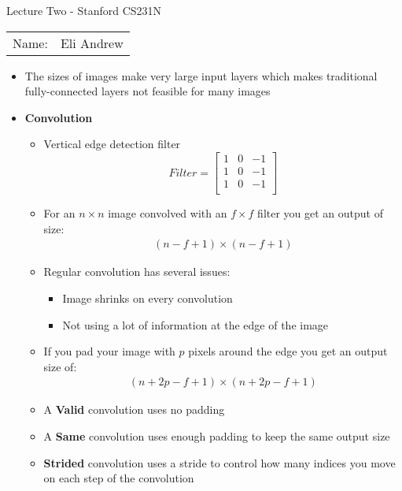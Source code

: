 \documentclass[12pt]{article}
\begin{document}
\begin{center}
{\Large Lecture Two - Stanford CS231N}

\begin{tabular}{rl}
Name: & Eli Andrew
\end{tabular}
\end{center}

  \begin{itemize}
    \item The sizes of images make very large input layers which makes
    traditional fully-connected layers not feasible for many images
    \item \textbf{Convolution}
    \begin{itemize}
        \item Vertical edge detection filter
        \begin{equation*}
            Filter = \begin{bmatrix}
                1 & 0 & -1 \\
                1 & 0 & -1 \\
                1 & 0 & -1 \\
            \end{bmatrix}
        \end{equation*}
        \item For an $n \times n$ image convolved with an $f \times f$ filter you get an output of size:
        \begin{gather*}
            (n - f + 1) \times (n - f + 1)
        \end{gather*}
        \item Regular convolution has several issues:
        \begin{itemize}
            \item Image shrinks on every convolution
            \item Not using a lot of information at the edge of the image
        \end{itemize}
        \item If you pad your image with $p$ pixels around the edge you get an output size of:
        \begin{gather*}
           (n + 2p - f + 1) \times (n + 2p - f + 1) 
        \end{gather*}
        \item A \textbf{Valid} convolution uses no padding
        \item A \textbf{Same} convolution uses enough padding to keep the same output size
        \item \textbf{Strided} convolution uses a stride to control how many indices you move on each step of the convolution

\end{itemize}
\end{itemize}
\end{document}
